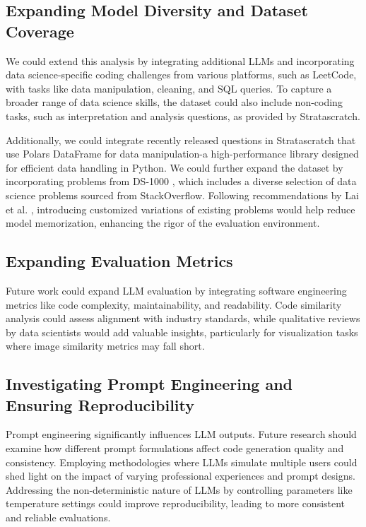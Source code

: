 \documentclass[conference]{IEEEtran}
\begin{document}
\subsection{Expanding Model Diversity and Dataset Coverage}

We could extend this analysis by integrating additional LLMs and incorporating data science-specific coding challenges from various platforms, such as LeetCode, with tasks like data manipulation, cleaning, and SQL queries. To capture a broader range of data science skills, the dataset could also include non-coding tasks, such as interpretation and analysis questions, as provided by Stratascratch.

Additionally, we could integrate recently released questions in Stratascratch that use Polars DataFrame \cite{polars2023} for data manipulation-a high-performance library designed for efficient data handling in Python.
We could further expand the dataset by incorporating problems from DS-1000 \cite{lai2023ds}, which includes a diverse selection of data science problems sourced from StackOverflow. Following recommendations by Lai et al. \cite{lai2023ds}, introducing customized variations of existing problems would help reduce model memorization, enhancing the rigor of the evaluation environment.

 

\subsection{Expanding Evaluation Metrics}
Future work could expand LLM evaluation by integrating software engineering metrics like code complexity, maintainability, and readability. Code similarity analysis could assess alignment with industry standards, while qualitative reviews by data scientists would add valuable insights, particularly for visualization tasks where image similarity metrics may fall short.


\subsection{Investigating Prompt Engineering and Ensuring Reproducibility}
Prompt engineering significantly influences LLM outputs. Future research should examine how different prompt formulations affect code generation quality and consistency. Employing methodologies where LLMs simulate multiple users \cite{aher2023using} could shed light on the impact of varying professional experiences and prompt designs. Addressing the non-deterministic nature of LLMs by controlling parameters like temperature settings could improve reproducibility, leading to more consistent and reliable evaluations.
\end{document}
